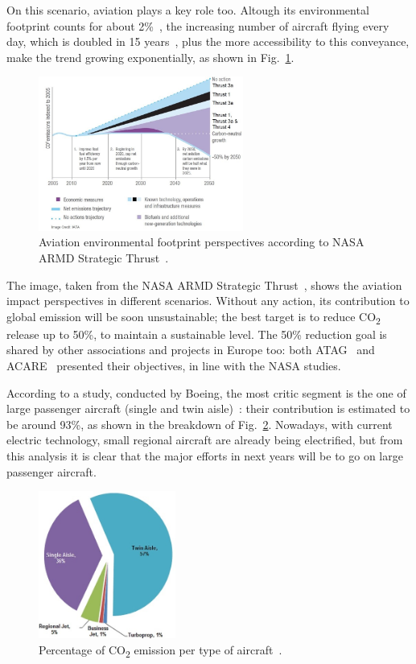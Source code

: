 On this scenario, aviation plays a key role too. 
Altough its environmental footprint counts for about 2\%~\cite{bib:iata}, the increasing number of aircraft flying every day, which is doubled in 15 years~\cite{bib:airbus_global_market}, plus the more accessibility to this conveyance, make the trend growing exponentially, as shown in Fig.~\ref{fig:aviation_impact_2050}. 
\begin{figure}[!h]
	\centering
	\includegraphics[keepaspectratio, width=0.6\textwidth]{images/chap1/aviation_impact_2050_perspectives.jpg}
	\caption{Aviation environmental footprint perspectives according to NASA ARMD Strategic Thrust~\cite{bib:nasa_armd}.}
	\label{fig:aviation_impact_2050}
\end{figure} 
The image, taken from the NASA ARMD Strategic Thrust~\cite{bib:nasa_armd}, shows the aviation impact perspectives in different scenarios. 
Without any action, its contribution to global emission will be soon unsustainable; the best target is to reduce CO\textsubscript{2} release up to 50\%, to maintain a sustainable level. 
The 50\% reduction goal is shared by other associations and projects in Europe too: both ATAG~\cite{bib:atag} and ACARE~\cite{bib:acare} presented their objectives, in line with the NASA studies.

According to a study, conducted by Boeing, the most critic segment is the one of large passenger aircraft (single and twin aisle)~\cite{bib:he_aviation_course}: their contribution is estimated to be around 93\%, as shown in the breakdown of Fig.~\ref{fig:aviation_emission_breakdown}.
Nowadays, with current electric technology, small regional aircraft are already being electrified, but from this analysis it is clear that the major efforts in next years will be to go on large passenger aircraft. 
\begin{figure}[!h]
	\centering
	\includegraphics[keepaspectratio, width=0.4\textwidth]{images/chap1/co2_emission_breakdown.jpg}
	\caption{Percentage of CO\textsubscript{2} emission per type of aircraft~\cite{bib:he_aviation_course}.}
	\label{fig:aviation_emission_breakdown}
\end{figure} 

